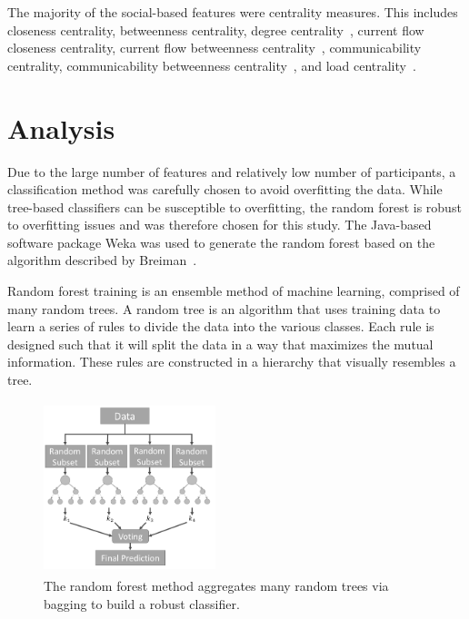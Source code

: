 \documentclass[10pt,twocolumn,conference]{IEEEtran}
\begin{document}
The majority of the social-based features were centrality measures.
This includes closeness centrality, betweenness centrality, degree centrality~\cite{borgatti2011analyzing}, current flow closeness centrality, current flow betweenness centrality~\cite{brandes2005centrality}, communicability centrality, communicability betweenness centrality~\cite{estrada2008communicability}, and load centrality~\cite{newman2001scientific}.

\section{Analysis} \label{Analysis}
Due to the large number of features and relatively low number of participants, a classification method was carefully chosen to avoid overfitting the data.
While tree-based classifiers can be susceptible to overfitting, the random forest is robust to overfitting issues and was therefore chosen for this study.
The Java-based software package Weka was used to generate the random forest based on the algorithm described by Breiman~\cite{Breiman2001}.

Random forest training is an ensemble method of machine learning, comprised of many random trees.
A random tree is an algorithm that uses training data to learn a series of rules to divide the data into the various classes.
Each rule is designed such that it will split the data in a way that maximizes the mutual information.
These rules are constructed in a hierarchy that visually resembles a tree.


\begin{figure}[t]
	\centering
	\includegraphics[width=5cm,height=5cm,keepaspectratio,trim={0mm 2.5mm 0mm 2mm},clip]{RandForest_BW}
	\caption{The random forest method aggregates many random trees via bagging to build a robust classifier.}
	\label{fig:rand_forest}
\end{figure}  
\end{document}
